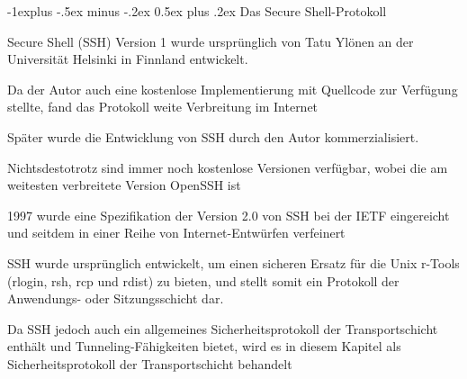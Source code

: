 \documentclass[a4paper]{article}
\makeatletter
\renewcommand{\subsection}{\@startsection{subsection}{2}{0mm}%
 {-1explus -.5ex minus -.2ex}%
 {0.5ex plus .2ex}%
 {\normalfont\normalsize\bfseries}}
\makeatother
\begin{document}
\begin{multicols}{3}
\begin{itemize*}
            \subsection{Das Secure
                  Shell-Protokoll}
            \begin{itemize*}
                  \item Secure Shell (SSH) Version 1 wurde ursprünglich von Tatu Ylönen an der
                  Universität Helsinki in Finnland entwickelt.
                  \item Da der Autor auch eine kostenlose Implementierung mit Quellcode zur
                  Verfügung stellte, fand das Protokoll weite Verbreitung im Internet
                  \item Später wurde die Entwicklung von SSH durch den Autor kommerzialisiert.
                  \item Nichtsdestotrotz sind immer noch kostenlose Versionen verfügbar, wobei
                  die am weitesten verbreitete Version OpenSSH ist
                  \item 1997 wurde eine Spezifikation der Version 2.0 von SSH bei der IETF
                  eingereicht und seitdem in einer Reihe von Internet-Entwürfen
                  verfeinert
                  \item SSH wurde ursprünglich entwickelt, um einen sicheren Ersatz für die
                  Unix r-Tools (rlogin, rsh, rcp und rdist) zu bieten, und stellt somit
                  ein Protokoll der Anwendungs- oder Sitzungsschicht dar.
                  \item Da SSH jedoch auch ein allgemeines Sicherheitsprotokoll der
                  Transportschicht enthält und Tunneling-Fähigkeiten bietet, wird es in
                  diesem Kapitel als Sicherheitsprotokoll der Transportschicht behandelt
            \end{itemize*}


\end{itemize*}
\end{multicols}
\end{document}
